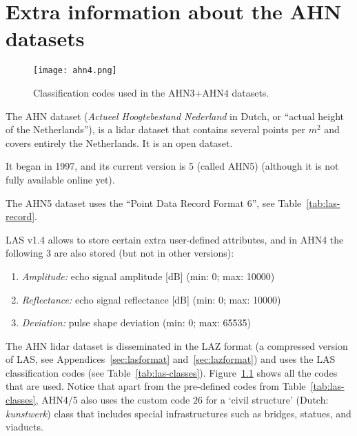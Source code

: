 
\graphicspath{{appendices/ahn/figs/}}

\chapter{Extra information about the AHN datasets}%
\label{app:ahn}


\begin{figure}
  \texttt{[image: ahn4.png]}
  \caption{Classification codes used in the AHN3+AHN4 datasets.}%
\label{fig:ahn3}
\end{figure}

The AHN dataset (\emph{Actueel Hoogtebestand Nederland} in Dutch, or ``actual height of the Netherlands''), 
is a lidar dataset that contains several points per $m^2$ and covers entirely the Netherlands.
It is an open dataset.

It began in 1997, and its current version is 5 (called AHN5) (although it is not fully available online yet).

The AHN5 dataset uses the ``Point Data Record Format 6'', see Table~\ref{tab:las-record}.

LAS v1.4 allows to store certain extra user-defined attributes, and in AHN4 the following 3 are also stored (but not in other versions):
\begin{enumerate}
  \item \emph{Amplitude:} echo signal amplitude [dB] (min: 0; max: 10000) 
  \item \emph{Reflectance:} echo signal reflectance [dB] (min: 0; max: 10000)
  \item \emph{Deviation:} pulse shape deviation (min: 0; max: 65535)
\end{enumerate}

%

The AHN lidar dataset is disseminated in the LAZ format (a compressed version of LAS, see Appendices~\ref{sec:lasformat} and~\ref{sec:lazformat}) and uses the LAS classification codes (see Table~\ref{tab:las-classes}). 
Figure~\ref{fig:ahn3} shows all the codes that are used. 
Notice that apart from the pre-defined codes from Table~\ref{tab:las-classes}, AHN4/5 also uses the custom code $26$ for a `civil structure' (Dutch: \emph{kunstwerk}) class that includes special infrastructures such as bridges, statues, and viaducts. 

